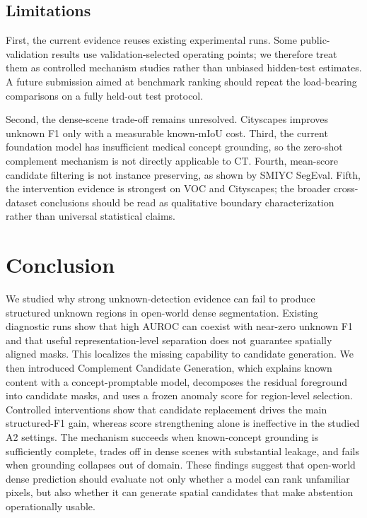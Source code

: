 \documentclass[journal]{IEEEtai}
\begin{document}
\subsection{Limitations}
First, the current evidence reuses existing experimental runs. Some public-validation results use validation-selected operating points; we therefore treat them as controlled mechanism studies rather than unbiased hidden-test estimates. A future submission aimed at benchmark ranking should repeat the load-bearing comparisons on a fully held-out test protocol.

Second, the dense-scene trade-off remains unresolved. Cityscapes improves unknown F1 only with a measurable known-mIoU cost. Third, the current foundation model has insufficient medical concept grounding, so the zero-shot complement mechanism is not directly applicable to CT. Fourth, mean-score candidate filtering is not instance preserving, as shown by SMIYC SegEval. Fifth, the intervention evidence is strongest on VOC and Cityscapes; the broader cross-dataset conclusions should be read as qualitative boundary characterization rather than universal statistical claims.

\section{Conclusion}
We studied why strong unknown-detection evidence can fail to produce structured unknown regions in open-world dense segmentation. Existing diagnostic runs show that high AUROC can coexist with near-zero unknown F1 and that useful representation-level separation does not guarantee spatially aligned masks. This localizes the missing capability to candidate generation. We then introduced Complement Candidate Generation, which explains known content with a concept-promptable model, decomposes the residual foreground into candidate masks, and uses a frozen anomaly score for region-level selection. Controlled interventions show that candidate replacement drives the main structured-F1 gain, whereas score strengthening alone is ineffective in the studied A2 settings. The mechanism succeeds when known-concept grounding is sufficiently complete, trades off in dense scenes with substantial leakage, and fails when grounding collapses out of domain. These findings suggest that open-world dense prediction should evaluate not only whether a model can rank unfamiliar pixels, but also whether it can generate spatial candidates that make abstention operationally usable.



\end{document}
